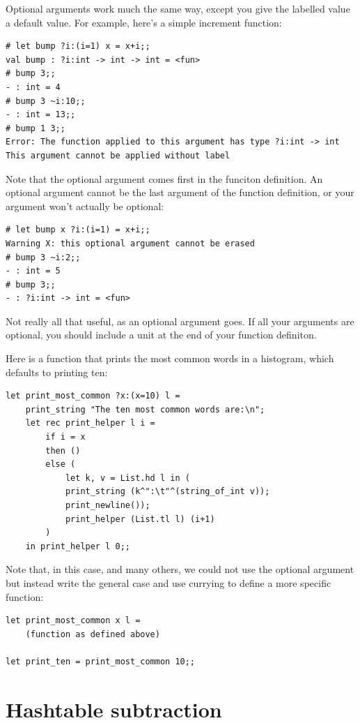 \documentclass[10pt]{book}
\begin{document}
Optional arguments work much the same way, except you give the labelled value a default value. For example, here's a simple increment function:
\beforeverb
\begin{verbatim}
# let bump ?i:(i=1) x = x+i;;
val bump : ?i:int -> int -> int = <fun>
# bump 3;;
- : int = 4
# bump 3 ~i:10;;
- : int = 13;;
# bump 1 3;;
Error: The function applied to this argument has type ?i:int -> int
This argument cannot be applied without label
\end{verbatim}
\afterverb
Note that the optional argument comes first in the funciton definition. An optional argument cannot be the last argument of the function definition, or your argument won't actually be optional:
\beforeverb
\begin{verbatim}
# let bump x ?i:(i=1) = x+i;;
Warning X: this optional argument cannot be erased
# bump 3 ~i:2;;
- : int = 5
# bump 3;;
- : ?i:int -> int = <fun>
\end{verbatim}
\afterverb
Not really all that useful, as an optional argument goes. If all your arguments are optional, you should include a unit at the end of your function definiton.

Here is a function that prints the most common words in a histogram, which defaults to printing ten:

\beforeverb
\begin{verbatim}
let print_most_common ?x:(x=10) l = 
	print_string "The ten most common words are:\n";
	let rec print_helper l i = 
		if i = x
		then ()
		else (
			let k, v = List.hd l in (
			print_string (k^":\t"^(string_of_int v));
			print_newline());
			print_helper (List.tl l) (i+1)
		)
	in print_helper l 0;;\end{verbatim}
\afterverb


Note that, in this case, and many others, we could not use the optional argument but instead write the general case and use currying to define a more specific function:
\beforeverb
\begin{verbatim}
let print_most_common x l = 
	(function as defined above)

let print_ten = print_most_common 10;;
\end{verbatim}
\afterverb

\section{Hashtable subtraction}
\end{document}

